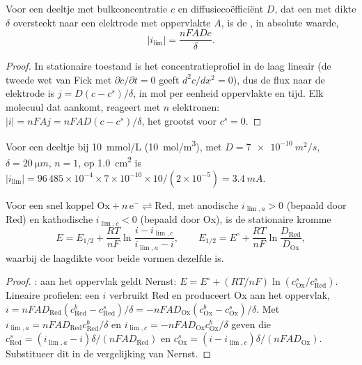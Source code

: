 \begin{theorem}[Grensstroom]\label{thm:b2:current-potential-curves:limiting}
Voor een deeltje met bulkconcentratie $c$ en diffusiecoëfficiënt $D$,
dat een  met dikte $\delta$ oversteekt naar een elektrode met oppervlakte $A$,
is de , in absolute waarde,
\[
  |i_{\lim}| = \frac{nFADc}{\delta} .
\]
\end{theorem}

\begin{proof}
In stationaire toestand is het concentratieprofiel in de laag lineair (de tweede wet van
Fick met $\partial c/\partial t = 0$ geeft $d^2c/dx^2 = 0$), dus de flux
naar de elektrode is $j = D(c - c^s)/\delta$, in mol per eenheid oppervlakte en
tijd. Elk molecuul dat aankomt, reageert met $n$ elektronen: $|i| = nFAj =
nFAD(c - c^s)/\delta$, het grootst voor $c^s = 0$.
\end{proof}

\begin{example}\label{ex:b2:current-potential-curves:ilim}
Voor een deeltje bij \qty{10}{mmol/L} (\qty{10}{mol/m^3}), met $D =
\qty{7e-10}{m^2/s}$, $\delta = \qty{20}{\micro m}$, $n = 1$, op
\qty{1.0}{cm^2} is $|i_{\lim}| = 96\,485 \times 10^{-4} \times 7 \times 10^{-10}
\times 10/(2 \times 10^{-5}) = \qty{3.4}{mA}$.
\end{example}

\begin{theorem}\label{thm:b2:current-potential-curves:wave}
Voor een snel koppel $\mathrm{Ox} + n\,\mathrm e^- \rightleftharpoons \mathrm{Red}$,
met anodische  $i_{\lim,a} > 0$ (bepaald door Red) en kathodische
 $i_{\lim,c} < 0$ (bepaald door Ox), is de stationaire kromme
\[
  E = E_{1/2} + \frac{RT}{nF}\ln\frac{i - i_{\lim,c}}{i_{\lim,a} - i},
  \qquad E_{1/2} = E^\circ + \frac{RT}{nF}\ln\frac{D_{\text{Red}}}{D_{\text{Ox}}} ,
\]
waarbij de laagdikte voor beide vormen dezelfde is.
\end{theorem}

\begin{proof}
: aan het oppervlak geldt Nernst: $E = E^\circ + (RT/nF)
\ln(c^s_{\text{Ox}}/c^s_{\text{Red}})$. Lineaire profielen: een  $i$
verbruikt Red en produceert Ox aan het oppervlak, $i = nFAD_{\text{Red}}(c^b_{\text{Red}}
- c^s_{\text{Red}})/\delta = -nFAD_{\text{Ox}}(c^b_{\text{Ox}} - c^s_{\text{Ox}})/\delta$.
Met $i_{\lim,a} = nFAD_{\text{Red}}c^b_{\text{Red}}/\delta$ en $i_{\lim,c} =
-nFAD_{\text{Ox}}c^b_{\text{Ox}}/\delta$ geven die $c^s_{\text{Red}} = (i_{\lim,a} -
i)\delta/(nFAD_{\text{Red}})$ en $c^s_{\text{Ox}} = (i - i_{\lim,c})\delta/(nFAD_{\text{Ox}})$.
Substitueer dit in de vergelijking van Nernst.
\end{proof}

